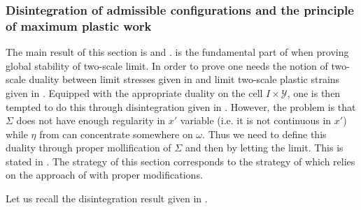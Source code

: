 \documentclass[reqno,10pt]{amsart}
\numberwithin{equation}{section}
\theoremstyle{remark}
\newcommand{\RED}{\color{black}}
\newcommand{\BLACK}{\color{black}}
\newcommand{\calY}{\mathcal{Y}}
\begin{document}
\subsubsection{Disintegration of admissible configurations and the principle of maximum plastic work} \label{subs:dis}
The main result of this section is  and . 
 is the fundamental part of  when proving global stability of two-scale limit. 
In order to prove  one needs the notion of two-scale duality between limit stresses given in  and limit two-scale plastic strains given in . 
Equipped with the appropriate duality on the cell $I \times \calY$, one is then tempted to do this through disintegration given in . 
However, the problem is that $\Sigma$ {\RED does not\BLACK} have enough regularity in $x'$ variable (i.e. it is not continuous in $x'$) while $\eta$ from  can concentrate somewhere on $\omega$. 
Thus we need to define this duality through proper mollification of $\Sigma$ and then by letting the limit. This is stated in . The strategy of this section corresponds to the strategy of \cite{Buzancic.Davoli.Velcic.2024.1st,Buzancic.Davoli.Velcic.2024.2nd} which relies on the approach of \cite{Francfort.Giacomini.2014} with proper modifications. 
 
Let us recall the disintegration result given in \cite[Lemma 5.18.]{Buzancic.Davoli.Velcic.2024.2nd}.
\end{document}

